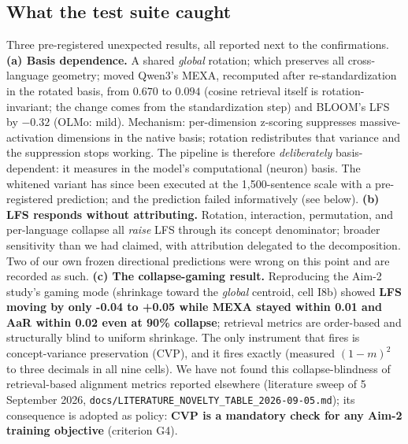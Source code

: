 \documentclass[11pt,a4paper]{article}
\begin{document}
\subsection{What the test suite caught}
Three pre-registered unexpected results, all reported next to the confirmations.
\textbf{(a) Basis dependence.} A shared \emph{global} rotation; which
preserves all cross-language geometry; moved Qwen3's MEXA, recomputed after re-standardization in the rotated basis, from $0.670$ to $0.094$ (cosine retrieval itself is rotation-invariant; the change comes from the standardization step) and BLOOM's LFS by $-0.32$ (OLMo: mild). Mechanism: per-dimension
z-scoring suppresses massive-activation dimensions in the native basis;
rotation redistributes that variance and the suppression stops working. The
pipeline is therefore \emph{deliberately} basis-dependent: it measures in
the model's computational (neuron) basis. The whitened variant has since
been executed at the 1,500-sentence scale with a pre-registered prediction; and the
prediction failed informatively (see below). \textbf{(b) LFS responds without
attributing.} Rotation, interaction, permutation, and per-language collapse
all \emph{raise} LFS through its concept denominator; broader sensitivity
than we had claimed, with attribution delegated to the decomposition. Two of our
own frozen directional predictions were wrong on this point and are recorded
as such. \textbf{(c) The collapse-gaming result.} Reproducing the Aim-2
study's gaming mode (shrinkage toward the \emph{global} centroid, cell I8b)
showed \textbf{LFS moving by only -0.04 to +0.05 while MEXA stayed within 0.01 and AaR within 0.02 even at 90\% collapse}; retrieval metrics are order-based and structurally blind to
uniform shrinkage. The only instrument that fires is concept-variance
preservation (CVP), and it fires exactly (measured $(1-m)^2$ to three
decimals in all nine cells). We have not found this collapse-blindness of retrieval-based alignment
metrics reported elsewhere (literature sweep of 5 September 2026,
\texttt{docs/LITERATURE\_NOVELTY\_TABLE\_2026-09-05.md}); its consequence is
adopted as policy: \textbf{CVP is a mandatory check for any Aim-2
training objective} (criterion G4).
\end{document}
